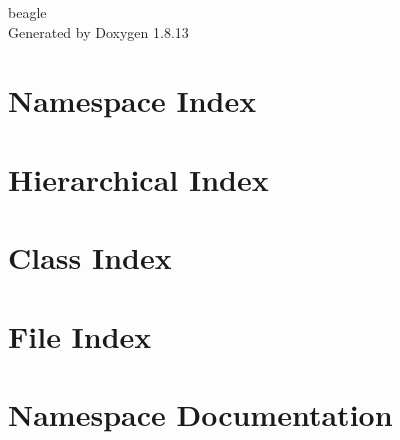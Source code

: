 \documentclass[twoside]{book}
\newcommand{\+}{\discretionary{\mbox{\scriptsize$\hookleftarrow$}}{}{}}
\newcommand{\clearemptydoublepage}{%
  \newpage{\pagestyle{empty}\cleardoublepage}%
}
\begin{document}
\hypersetup{pageanchor=false,
             bookmarksnumbered=true,
             pdfencoding=unicode
            }
\begin{titlepage}
\vspace*{7cm}
\begin{center}%
{\Large beagle }\\
\vspace*{1cm}
{\large Generated by Doxygen 1.8.13}\\
\end{center}
\end{titlepage}
\clearemptydoublepage
{}
\tableofcontents
\clearemptydoublepage
{}
\hypersetup{pageanchor=true}

\chapter{Namespace Index}

\chapter{Hierarchical Index}

\chapter{Class Index}

\chapter{File Index}

\chapter{Namespace Documentation}




\end{document}
